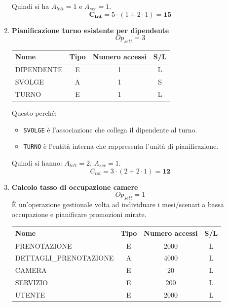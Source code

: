 \documentclass[a4paper,12pt]{report}
\begin{document}
\begin{enumerate}
	      Quindi si ha $A_{lett}=1$ e $A_{scr}=1$.
	      $$\mathbf{C_{tot}} = 5 \cdot (1 + 2 \cdot 1) = \mathbf{15}$$

	\item {\large \textbf{Pianificazione turno esistente per dipendente}} \label{op18}
	      $$
		      Op_{sett} = 3
	      $$

		\begin{table}[H]
		\centering
		\small
		\renewcommand{\arraystretch}{1.15}
		\begin{tabularx}{0.8\textwidth}{|X|c|c|c|}
				\hline
				\rowcolor{gray!20}
				\textbf{Nome} & \textbf{Tipo} & \textbf{Numero accessi} & \textbf{S/L} \\
				\hline
				DIPENDENTE & E & 1 & L \\
				SVOLGE     & A & 1 & S \\
				TURNO      & E & 1 & L \\
				\hline
			\end{tabularx}
		\end{table}

		
		  Questo perché:
	      \begin{itemize}
		      \item \texttt{SVOLGE} è l'associazione che collega il dipendente al turno.
		      \item \texttt{TURNO} è l'entità interna che rappresenta l'unità di pianificazione.
	      \end{itemize}

	      Quindi si hanno: $A_{lett}=2$, $A_{scr}=1$.
	      $$C_{tot} = 3 \cdot (2 + 2 \cdot 1) = \mathbf{12}$$


	\item {\large \textbf{Calcolo tasso di occupazione camere}} \label{op19}
	      $$
		      {Op}_{sett} = 1
	      $$
	      È un'operazione gestionale volta ad individuare i mesi/scenari a bassa occupazione e pianificare promozioni mirate.

	      \begin{table}[H]
		      \centering
		      \small
		      \renewcommand{\arraystretch}{1.15}
		      \begin{tabularx}{0.8\textwidth}{|X|c|c|c|}
			      \hline
			      \rowcolor{gray!20}
			      \textbf{Nome}          & \textbf{Tipo} & \textbf{Numero accessi} & \textbf{S/L} \\
			      \hline
			      PRENOTAZIONE           & E             & 2000                    & L            \\
			      DETTAGLI\_PRENOTAZIONE & A             & 4000                    & L            \\
			      CAMERA                 & E             & 20                      & L            \\
			      SERVIZIO               & E             & 200                     & L            \\
			      UTENTE                 & E             & 2000                    & L            \\
			      \hline
		      \end{tabularx}
	      \end{table}


\end{enumerate}
\end{document}
